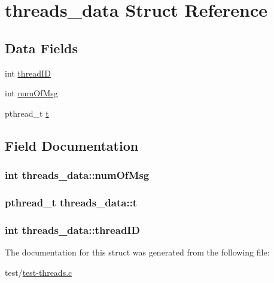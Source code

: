 \hypertarget{structthreads__data}{\section{threads\-\_\-data Struct Reference}
\label{structthreads__data}
}
\subsection*{Data Fields}
\begin{DoxyCompactItemize}
\item 
int \hyperlink{structthreads__data_a103610a90418be4e860c84a09d64b472}{thread\-I\-D}
\item 
int \hyperlink{structthreads__data_a603ce1421df0c695e87e1638f7873651}{num\-Of\-Msg}
\item 
pthread\-\_\-t \hyperlink{structthreads__data_a47ca89f1b1be34208d5421333677e802}{t}
\end{DoxyCompactItemize}


\subsection{Field Documentation}
\hypertarget{structthreads__data_a603ce1421df0c695e87e1638f7873651}{
\subsubsection[{num\-Of\-Msg}]{\setlength{\rightskip}{0pt plus 5cm}int threads\-\_\-data\-::num\-Of\-Msg}}\label{structthreads__data_a603ce1421df0c695e87e1638f7873651}
\hypertarget{structthreads__data_a47ca89f1b1be34208d5421333677e802}{
\subsubsection[{t}]{\setlength{\rightskip}{0pt plus 5cm}pthread\-\_\-t threads\-\_\-data\-::t}}\label{structthreads__data_a47ca89f1b1be34208d5421333677e802}
\hypertarget{structthreads__data_a103610a90418be4e860c84a09d64b472}{
\subsubsection[{thread\-I\-D}]{\setlength{\rightskip}{0pt plus 5cm}int threads\-\_\-data\-::thread\-I\-D}}\label{structthreads__data_a103610a90418be4e860c84a09d64b472}


The documentation for this struct was generated from the following file\-:\begin{DoxyCompactItemize}
\item 
test/\hyperlink{test-threads_8c}{test-\/threads.\-c}\end{DoxyCompactItemize}
